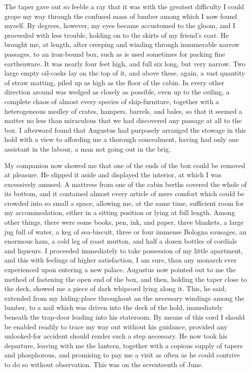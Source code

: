 The taper gave out so feeble a ray that it was with the greatest difficulty I
could grope my way through the confused mass of lumber among which I now found
myself. By degrees, however, my eyes became accustomed to the gloom, and I
proceeded with less trouble, holding on to the skirts of my friend's coat. He
brought me, at length, after creeping and winding through innumerable narrow
passages, to an iron-bound box, such as is used sometimes for packing fine
earthenware. It was nearly four feet high, and full six long, but very narrow.
Two large empty oil-casks lay on the top of it, and above these, again, a vast
quantity of straw matting, piled up as high as the floor of the cabin. In every
other direction around was wedged as closely as possible, even up to the
ceiling, a complete chaos of almost every species of ship-furniture, together
with a heterogeneous medley of crates, hampers, barrels, and bales, so that it
seemed a matter no less than miraculous that we had discovered any passage at
all to the box. I afterward found that Augustus had purposely arranged the
stowage in this hold with a view to affording me a thorough concealment, having
had only one assistant in the labour, a man not going out in the brig. 

My companion now showed me that one of the ends of the box could be removed
at pleasure. He slipped it aside and displayed the interior, at which I was
excessively amused. A mattress from one of the cabin berths covered the whole of
its bottom, and it contained almost every article of mere comfort which could be
crowded into so small a space, allowing me, at the same time, sufficient room
for my accommodation, either in a sitting position or lying at full length.
Among other things, there were some books, pen, ink, and paper, three blankets,
a large jug full of water, a keg of sea-biscuit, three or four immense Bologna
sausages, an enormous ham, a cold leg of roast mutton, and half a dozen bottles
of cordials and liqueurs. I proceeded immediately to take possession of my
little apartment, and this with feelings of higher satisfaction, I am sure, than
any monarch ever experienced upon entering a new palace. Augustus now pointed
out to me the method of fastening the open end of the box, and then, holding the
taper close to the deck, showed me a piece of dark whipcord lying along it.
This, he said, extended from my hiding-place throughout an the necessary
windings among the lumber, to a nail which was driven into the deck of the hold,
immediately beneath the trap-door leading into his stateroom. By means of this
cord I should be enabled readily to trace my way out without his guidance,
provided any unlooked-for accident should render such a step necessary. He now
took his departure, leaving with me the lantern, together with a copious supply
of tapers and phosphorous, and promising to pay me a visit as often as he could
contrive to do so without observation. This was on the seventeenth of June. 

